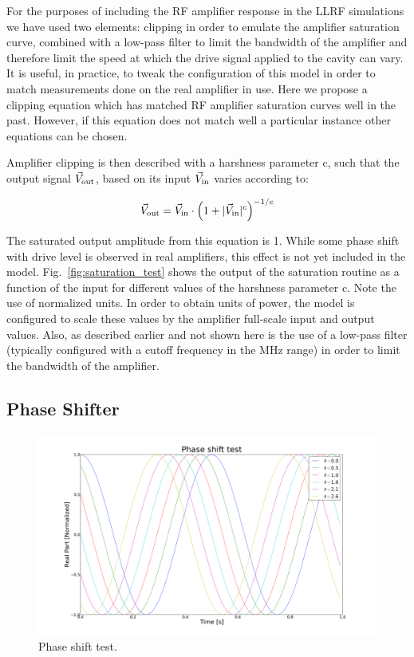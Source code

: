 \documentclass[a4paper,12pt]{article}
\begin{document}
For the purposes of including the RF amplifier response in the LLRF simulations we have used two elements: clipping in order to emulate the amplifier saturation curve, combined with a low-pass filter to limit the bandwidth of the amplifier and therefore limit the speed at which the drive signal applied to the cavity can vary. It is useful, in practice, to tweak the configuration of this model in order to match measurements done on the real amplifier in use. Here we propose a clipping equation which has matched RF amplifier saturation curves well in the past. However, if this equation does not match well a particular instance other equations can be chosen.

Amplifier clipping is then described with a harshness parameter c, such that the output signal $\vec V_{\rm out}$, based on its input $\vec V_{\rm in}$ varies according to:

\begin{equation}
  \vec V_{\rm out} = \vec V_{\rm in} \cdot \left(1 + |\vec V_{\rm in}|^c\right)^{-1/c}
  \label{eq:clip}
\end{equation}

The saturated output amplitude from this equation is 1. While some phase shift with drive level is observed in real amplifiers, this effect is not yet included in the model. Fig.~\ref{fig:saturation_test} shows the output of the saturation routine as a function of the input for different values of the harshness parameter c. Note the use of normalized units. In order to obtain units of power, the model is configured to scale these values by the amplifier full-scale input and output values. Also, as described earlier and not shown here is the use of a low-pass filter (typically configured with a cutoff frequency in the MHz range) in order to limit the bandwidth of the amplifier.

\subsection{Phase Shifter}

\begin{figure}
\centering
\includegraphics[scale=0.265]{../figures/phase_shift_test.png}
\caption{Phase shift test.}
\label{fig:phase_shfiter_test}
\end{figure}
\end{document}
